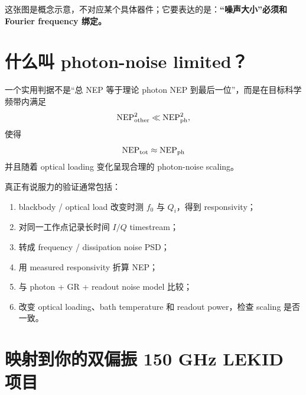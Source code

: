 \documentclass[11pt,a4paper,openany]{ctexrep}
\begin{document}
\begin{center}
\end{center}

这张图是概念示意，不对应某个具体器件；它要表达的是：\textbf{“噪声大小”必须和 Fourier frequency 绑定。}

\section{什么叫 photon-noise limited？}

一个实用判据不是“总 NEP 等于理论 photon NEP 到最后一位”，而是在目标科学频带内满足
\[
\mathrm{NEP}_{\rm other}^2
\ll
\mathrm{NEP}_{\rm ph}^2,
\]
使得
\[
\mathrm{NEP}_{\rm tot}
\approx
\mathrm{NEP}_{\rm ph}
\]
并且随着 optical loading 变化呈现合理的 photon-noise scaling。

真正有说服力的验证通常包括：
\begin{enumerate}
  \item blackbody / optical load 改变时测 $f_0$ 与 $Q_i$，得到 responsivity；
  \item 对同一工作点记录长时间 $I/Q$ timestream；
  \item 转成 frequency / dissipation noise PSD；
  \item 用 measured responsivity 折算 NEP；
  \item 与 photon + GR + readout noise model 比较；
  \item 改变 optical loading、bath temperature 和 readout power，检查 scaling 是否一致。
\end{enumerate}

\section{映射到你的双偏振 150 GHz LEKID 项目}
\end{document}
